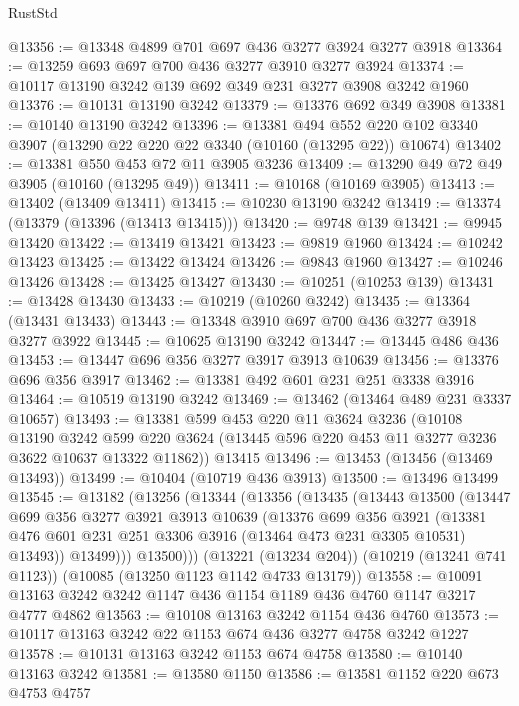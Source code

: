 \begin{lexlean}{RustStd}
\begin{coremodule}
@13356 := @13348 @4899 @701 @697 @436 @3277 @3924 @3277 @3918
@13364 := @13259 @693 @697 @700 @436 @3277 @3910 @3277 @3924
@13374 := @10117 @13190 @3242 @139 @692 @349 @231 @3277 @3908 @3242 @1960
@13376 := @10131 @13190 @3242
@13379 := @13376 @692 @349 @3908
@13381 := @10140 @13190 @3242
@13396 := @13381
    @494
    @552
    @220
    @102
    @3340
    @3907
    (@13290 @22 @220 @22 @3340 (@10160 (@13295 @22)) @10674)
@13402 := @13381 @550 @453 @72 @11 @3905 @3236
@13409 := @13290 @49 @72 @49 @3905 (@10160 (@13295 @49))
@13411 := @10168 (@10169 @3905)
@13413 := @13402 (@13409 @13411)
@13415 := @10230 @13190 @3242
@13419 := @13374 (@13379 (@13396 (@13413 @13415)))
@13420 := @9748 @139
@13421 := @9945 @13420
@13422 := @13419 @13421
@13423 := @9819 @1960
@13424 := @10242 @13423
@13425 := @13422 @13424
@13426 := @9843 @1960
@13427 := @10246 @13426
@13428 := @13425 @13427
@13430 := @10251 (@10253 @139)
@13431 := @13428 @13430
@13433 := @10219 (@10260 @3242)
@13435 := @13364 (@13431 @13433)
@13443 := @13348 @3910 @697 @700 @436 @3277 @3918 @3277 @3922
@13445 := @10625 @13190 @3242
@13447 := @13445 @486 @436
@13453 := @13447 @696 @356 @3277 @3917 @3913 @10639
@13456 := @13376 @696 @356 @3917
@13462 := @13381 @492 @601 @231 @251 @3338 @3916
@13464 := @10519 @13190 @3242
@13469 := @13462 (@13464 @489 @231 @3337 @10657)
@13493 := @13381
    @599
    @453
    @220
    @11
    @3624
    @3236
    (@10108
      @13190
      @3242
      @599
      @220
      @3624
      (@13445 @596 @220 @453 @11 @3277 @3236 @3622 @10637 @13322 @11862))
    @13415
@13496 := @13453 (@13456 (@13469 @13493))
@13499 := @10404 (@10719 @436 @3913)
@13500 := @13496 @13499
@13545 := @13182
    (@13256
      (@13344
        (@13356
          (@13435
            (@13443
              @13500
              (@13447
                @699
                @356
                @3277
                @3921
                @3913
                @10639
                (@13376
                  @699
                  @356
                  @3921
                  (@13381 @476 @601 @231 @251 @3306 @3916 (@13464 @473 @231 @3305 @10531) @13493))
                @13499)))
          @13500)))
    (@13221 (@13234 @204))
    (@10219 (@13241 @741 @1123))
    (@10085 (@13250 @1123 @1142 @4733 @13179))
@13558 := @10091 @13163 @3242 @3242 @1147 @436 @1154 @1189 @436 @4760 @1147 @3217 @4777 @4862
@13563 := @10108 @13163 @3242 @1154 @436 @4760
@13573 := @10117 @13163 @3242 @22 @1153 @674 @436 @3277 @4758 @3242 @1227
@13578 := @10131 @13163 @3242 @1153 @674 @4758
@13580 := @10140 @13163 @3242
@13581 := @13580 @1150
@13586 := @13581 @1152 @220 @673 @4753 @4757

\end{coremodule}
\end{lexlean}
